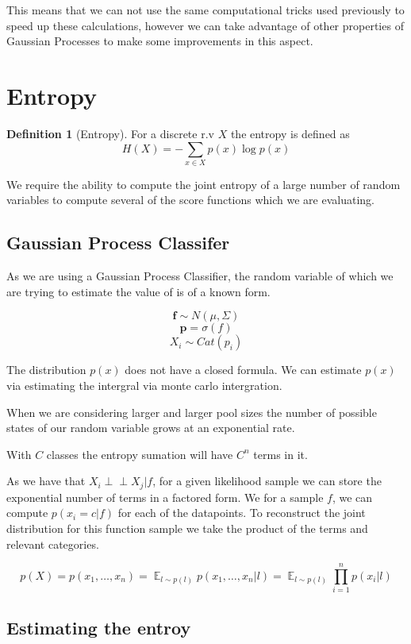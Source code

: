 \documentclass[12pt, a4paper]{report}
\theoremstyle{definition}
\newtheorem{definition}{Definition}[section]
\DeclareMathOperator{\E}{\mathbb{E}}
\begin{document}
This means that we can not use the same computational tricks used previously to speed up these calculations, however we can take advantage of other properties of Gaussian Processes to make some improvements in this aspect.


\section{Entropy}
\label{sec:Entropy}

\begin{definition}[Entropy]
    For a discrete r.v $X$ the entropy is defined as $$H(X) = - \sum_{x \in X} p(x) \log p(x) $$
\end{definition}


We require the ability to compute the joint entropy of a large number of random variables to compute several of the score functions which we are evaluating.

\subsection{Gaussian Process Classifer}
As we are using a Gaussian Process Classifier, the random variable of which we are trying to estimate the value of is of a known form.


$$ \mathbf{f} \sim N(\mu, \Sigma) $$
$$ \mathbf{p} =  \sigma \left(f \right) $$
$$ X_i \sim Cat(p_i) $$

The distribution $p(x)$ does not have a closed formula. We can estimate $p(x)$ via estimating the intergral via monte carlo intergration.

When we are considering larger and larger pool sizes the number of possible states of our random variable grows at an exponential rate.

With $C$ classes the entropy sumation will have $C^n$ terms in it. 

As we have that $ X_i \perp\!\!\!\perp X_j | f$, for a given likelihood sample we can store the exponential number of terms in a factored form. We for a sample $f$, we can compute $p(x_i = c | f)$ for each of the datapoints. To reconstruct the joint distribution for this function sample we take the product of the terms and relevant categories.


$$ p(X) = p(x_1, \ldots, x_n) = \E_{l \sim p(l)}  p(x_1, \ldots, x_n | l) = \E_{l \sim p(l)} \prod_{i=1}^n  p(x_i| l)$$

\subsection{Estimating the entroy}
\end{document}
